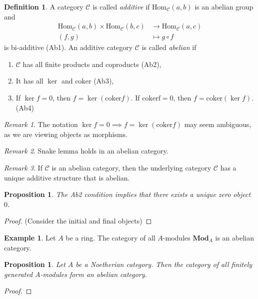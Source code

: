\documentclass[12pt]{report}
\theoremstyle{plain}
\newtheorem{proposition}[theorem]{Proposition}
\theoremstyle{remark}
\newtheorem*{remark}{Remark}
\theoremstyle{definition}
\newtheorem{definition}[theorem]{Definition}
\newtheorem{example}[theorem]{Example}
\newcommand{\Hom}[3]{\mathrm{Hom}_{#3}(#1,#2)}
\begin{document}
\begin{definition}
    A category $\mathcal{C}$ is called \emph{additive} if $\Hom{a}{b}{\mathcal{C}}$ is an abelian group and
    \begin{align*}
        \Hom{a}{b}{\mathcal{C}}\times \Hom{b}{c}{\mathcal{C}} &\rightarrow \Hom{a}{c}{\mathcal{C}} \\
        (f,g) &\mapsto g\circ f
    \end{align*}
    is bi-additive (Ab1). An additive category $\mathcal{C}$ is called \emph{abelian} if
    \begin{enumerate}
        \item $\mathcal{C}$ has all finite products and coproducts (Ab2),
        \item It has all $\ker$ and $\mathrm{coker}$ (Ab3),
        \item If $\ker f=0$, then $f=\ker (\mathrm{coker}f)$. If $\mathrm{coker f=0}$, then $f=\mathrm{coker}(\ker f)$. (Ab4)
    \end{enumerate}
\end{definition}
\begin{remark}
    The notation $\ker f=0\implies f=\ker (\mathrm{coker}f)$ may seem ambiguous, as we are viewing objects as morphisms. 
\end{remark}
\begin{remark}
    Snake lemma holds in an abelian category.
\end{remark}
\begin{remark}
    If $\mathcal{C}$ is an abelian category, then the underlying category $\mathcal{C}$ has a unique additive structure that is abelian.
\end{remark}

\begin{proposition}
    The Ab2 condition implies that there exists a unique zero object $0$.
\end{proposition}
\begin{proof}
    (Consider the initial and final objects)
\end{proof}

\begin{example}
    Let $A$ be a ring. The category of all $A$-modules $\mathbf{Mod}_A$ is an abelian category.
\end{example}

\begin{proposition}
    Let $A$ be a Noetherian category. Then the category of all finitely generated $A$-modules form an abelian category.
\end{proposition}
\begin{proof}
    
\end{proof}
\end{document}
